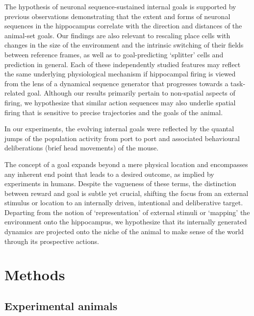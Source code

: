 The hypothesis of neuronal sequence-sustained internal goals is supported by previous observations demonstrating that the extent and forms of neuronal sequences in the hippocampus correlate with the direction and distances of the animal-set goals. Our findings are also relevant to rescaling place cells with changes in the size of the environment and the intrinsic switching of their fields between reference frames, as well as to goal-predicting `splitter' cells and prediction in general. Each of these independently studied features may reflect the same underlying physiological mechanism if hippocampal firing is viewed from the lens of a dynamical sequence generator that progresses towards a task-related goal. Although our results primarily pertain to non-spatial aspects of firing, we hypothesize that similar action sequences may also underlie spatial firing that is sensitive to precise trajectories and the goals of the animal.

In our experiments, the evolving internal goals were reflected by the quantal jumps of the population activity from port to port and associated behavioural deliberations (brief head movements) of the mouse.

The concept of a goal expands beyond a mere physical location and encompasses any inherent end point that leads to a desired outcome, as implied by experiments in humans. Despite the vagueness of these terms, the distinction between reward and goal is subtle yet crucial, shifting the focus from an external stimulus or location to an internally driven, intentional and deliberative target. Departing from the notion of `representation' of external stimuli or `mapping' the environment onto the hippocampus, we hypothesize that its internally generated dynamics are projected onto the niche of the animal to make sense of the world through its prospective actions.

\section{Methods}

\subsection{Experimental animals}

